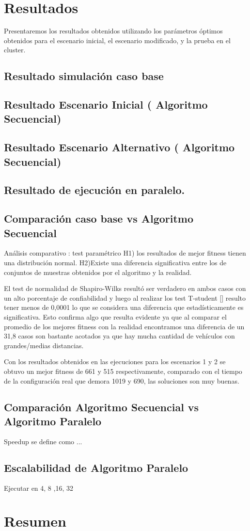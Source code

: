 \section{Resultados}
Presentaremos los resultados obtenidos  utilizando los parámetros óptimos obtenidos para el escenario inicial, el escenario modificado, y la prueba en el cluster.

\subsection{Resultado simulación caso base}
\subsection{Resultado Escenario Inicial ( Algoritmo  Secuencial)}
\subsection{Resultado Escenario Alternativo ( Algoritmo  Secuencial)}
\subsection{Resultado de ejecución en paralelo. }

\subsection{Comparación caso base vs Algoritmo Secuencial}
Análisis comparativo : test paramétrico
H1)  los  resultados  de  mejor  fitness  tienen  una distribución normal.
H2)Existe  una  diferencia  significativa  entre  los  de conjuntos  de  muestras  obtenidos  por  el  algoritmo  y  la realidad.

El  test  de  normalidad  de  Shapiro-Wilks  resultó  ser verdadero  en  ambos  casos  con  un  alto  porcentaje  de
confiabilidad y luego al realizar los test T-student [] resulto tener menos de 0,0001 lo que se considera una diferencia que
estadísticamente  es  significativa.  Esto confirma algo que resulta evidente ya que al comparar
el promedio de los mejores fitness con la realidad encontramos
una diferencia de un 31,8%
casos  son  bastante  acotados  ya  que  hay  mucha  cantidad  de
vehículos con grandes/medias distancias.

Con  los  resultados  obtenidos  en  las  ejecuciones  para  los
escenarios  1  y  2  se  obtuvo  un  mejor  fitness  de  661  y  515
respectivamente, comparado con el tiempo de la configuración
real que demora 1019 y 690, las soluciones son muy buenas.



\subsection{Comparación Algoritmo Secuencial vs Algoritmo Paralelo}
Speedup se define como ...

\subsection{Escalabilidad de Algoritmo Paralelo }
Ejecutar en 4, 8 ,16, 32

\section{Resumen}

